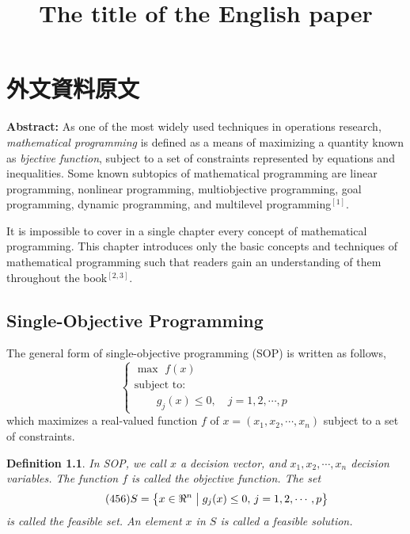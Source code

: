 \chapter{外文資料原文}
\label{cha:engorg}

\title{The title of the English paper}

\textbf{Abstract:} As one of the most widely used techniques in operations
research, \emph{ mathematical programming} is defined as a means of maximizing a
quantity known as \emph{bjective function}, subject to a set of constraints
represented by equations and inequalities. Some known subtopics of mathematical
programming are linear programming, nonlinear programming, multiobjective
programming, goal programming, dynamic programming, and multilevel
programming$^{[1]}$.

It is impossible to cover in a single chapter every concept of mathematical
programming. This chapter introduces only the basic concepts and techniques of
mathematical programming such that readers gain an understanding of them
throughout the book$^{[2,3]}$.


\section{Single-Objective Programming}
The general form of single-objective programming (SOP) is written
as follows,
\begin{equation}\tag*{(123)} %
\left\{\begin{array}{l}
\max \,\,f(x)\\[0.1 cm]
\mbox{subject to:} \\ [0.1 cm]
\qquad g_j(x)\le 0,\quad j=1,2,\cdots,p
\end{array}\right.
\end{equation}
which maximizes a real-valued function $f$ of
$x=(x_1,x_2,\cdots,x_n)$ subject to a set of constraints.

\newtheorem{mpdef}{Definition}[chapter]
\begin{mpdef}
In SOP, we call $x$ a decision vector, and
$x_1,x_2,\cdots,x_n$ decision variables. The function
$f$ is called the objective function. The set
\begin{equation}\tag*{(456)} %
S=\left\{x\in\Re^n\bigm|g_j(x)\le 0,\,j=1,2,\cdots,p\right\}
\end{equation}
is called the feasible set. An element $x$ in $S$ is called a
feasible solution.
\end{mpdef}

